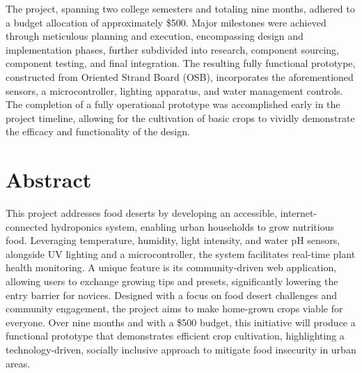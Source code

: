 \documentclass[12pt]{article}
\newcommand{\comment}[1]{} %
\begin{document}
The project, spanning two college semesters and totaling nine months, adhered to a budget allocation of approximately \$500. Major milestones were achieved through meticulous planning and execution, encompassing design and implementation phases, further subdivided into research, component sourcing, component testing, and final integration. The resulting fully functional prototype, constructed from Oriented Strand Board (OSB), incorporates the aforementioned sensors, a microcontroller, lighting apparatus, and water management controls. The completion of a fully operational prototype was accomplished early in the project timeline, allowing for the cultivation of basic crops to vividly demonstrate the efficacy and functionality of the design.

\comment{


\section*{Dedication}
\addcontentsline{toc}{section}{Dedication}
\lipsum[1] %


}

\comment {


\section*{Acknowledgment}
\addcontentsline{toc}{section}{Acknowledgment}
\lipsum[1] %

}

\tableofcontents
\pagebreak

\listoftables
\pagebreak

\listoffigures
\pagebreak

\section*{Abstract}
This project addresses food deserts by developing an accessible, internet-connected hydroponics system, enabling urban households to grow nutritious food. Leveraging temperature, humidity, light intensity, and water pH sensors, alongside UV lighting and a microcontroller, the system facilitates real-time plant health monitoring. A unique feature is its community-driven web application, allowing users to exchange growing tips and presets, significantly lowering the entry barrier for novices. Designed with a focus on food desert challenges and community engagement, the project aims to make home-grown crops viable for everyone. Over nine months and with a \$500 budget, this initiative will produce a functional prototype that demonstrates efficient crop cultivation, highlighting a technology-driven, socially inclusive approach to mitigate food insecurity in urban areas.
\end{document}

